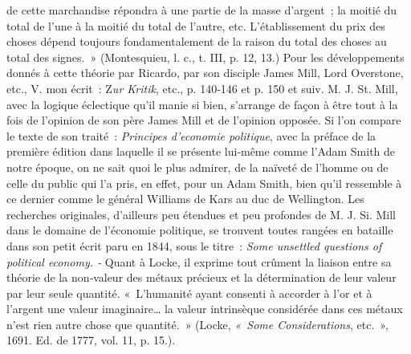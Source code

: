\documentclass[french,twoside]{book} %
\begin{document}
{de cette marchandise répondra à une partie de la masse d’argent ; la moitié du total de l’une à la moitié du total de l’autre, etc. L’établissement du prix des choses dépend toujours fondamentalement de la raison du total des choses au total des signes. » (Montesquieu, l. c., t. III, p. 12, 13.) Pour les développements donnés à cette théorie par Ricardo, par son disciple James Mill, Lord Overstone, etc., V. mon écrit : Z\emph{ur Kritik}, etc., p. 140‑146 et p. 150 et suiv. M. J. St. Mill, avec la logique éclectique qu’il manie si bien, s’arrange de façon à être tout à la fois de l’opinion de son père James Mill et de l’opinion opposée. Si l’on compare le texte de son traité : \emph{Principes d’economie politique}, avec la préface de la première édition dans laquelle il se présente lui‑même comme l’Adam Smith de notre époque, on ne sait quoi le plus admirer, de la naïveté de l’homme ou de celle du public qui l’a pris, en effet, pour un Adam Smith, bien qu’il ressemble à ce dernier comme le général Williams de Kars au duc de Wellington. Les recherches originales, d’ailleurs peu étendues et peu profondes de M. J. Si. Mill dans le domaine de l’économie politique, se trouvent toutes rangées en bataille dans son petit écrit paru en 1844, sous le titre : \emph{Some unsettled questions of political economy. ‑} Quant à Locke, il exprime tout crûment la liaison entre sa théorie de la non‑valeur des métaux précieux et la détermination de leur valeur par leur seule quantité. « L’humanité ayant consenti à accorder à l’or et à l’argent une valeur imaginaire… la valeur intrinsèque considérée dans ces métaux n’est rien autre chose que quantité. » (Locke, \emph{« Some Considerations}, etc. », 1691. Ed. de 1777, vol. 11, p. 15.)}.
\end{document}
